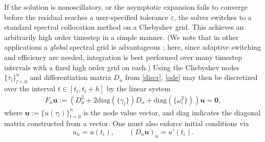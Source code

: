 \documentclass[10pt]{article}
\newcommand{\be}{\begin{equation}}
\newcommand{\ee}{\end{equation}}
\newcommand{\mbf}[1]{{\mathbf #1}}
\newcommand{\om}{\omega}
\newcommand{\g}{\gamma}
\begin{document}
If the solution is nonoscillatory, or the asymptotic expansion fails to
converge before the residual reaches a user-specified tolerance $\varepsilon$, the solver switches to a standard spectral collocation method on a Chebyshev grid.
This achieves an arbitrarily high order timestep in a simple manner.
(We note that in other applications a \emph{global} spectral grid is
advantageous \cite{tref}; here, since adaptive switching and efficiency are
needed,
integration is best performed over many timestep intervals with a fixed high
order grid on each.)
%
Using the
Chebyshev nodes $\{\tau_l\}_{l=0}^n$ and differentiation matrix $D_n$
from \cref{discr},
\cref{ode} may then be discretized over the interval $t \in [t_i, t_i+h]$ by
the linear system
\begin{align}\label{discreteode}
  F_n \mbf{u} := \left(D_n^2 + 2\text{diag}(\{\g_l\})D_n + \text{diag}(\{\om_l^2\}) \right)\mbf{u} = \mbf{0},
\end{align}
where $\mbf{u}:=\{u(\tau_l)\}_{l=0}^n$ is the node value vector, and
diag indicates the diagonal matrix constructed from a vector.
One must also enforce initial conditions via
\be\label{discreteic}
u_n
= u(t_i), \qquad \left(D_n\mbf{u}\right)_n = u'(t_i).
\ee
\end{document}
